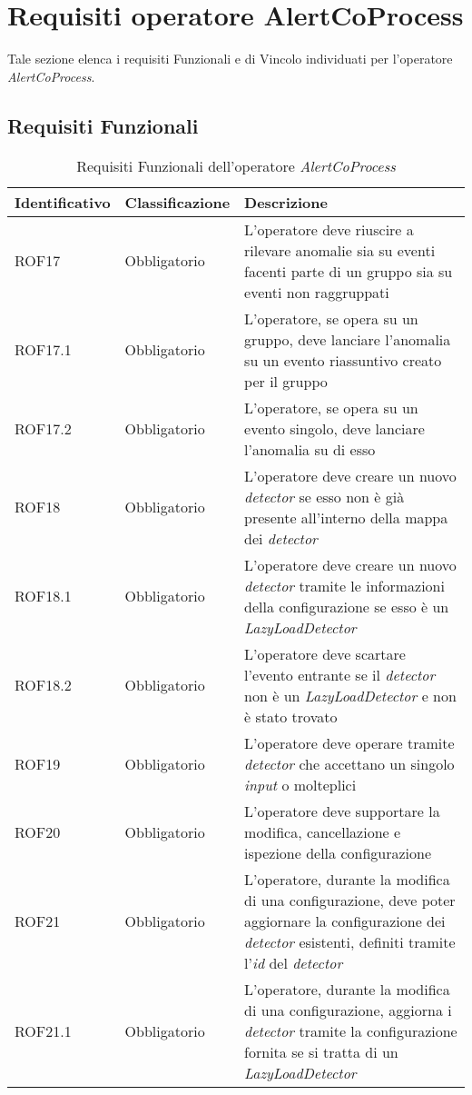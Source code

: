 \section{Requisiti operatore AlertCoProcess}
Tale sezione elenca i requisiti Funzionali e di Vincolo individuati per l'operatore \textit{AlertCoProcess}.
\subsection{Requisiti Funzionali}
{
\centering
\begin{longtable}{L{3cm} L{3cm} L{7.5cm}}
\caption{Requisiti Funzionali dell'operatore \textit{AlertCoProcess}}\\
\textbf{Identificativo} &
\textbf{Classificazione}&
\textbf{Descrizione}\\
\endhead
\hline
ROF17 & Obbligatorio & L'operatore deve riuscire a rilevare anomalie sia su eventi facenti parte di un gruppo sia su eventi non raggruppati\\
\hline
ROF17.1 & Obbligatorio & L'operatore, se opera su un gruppo, deve lanciare l'anomalia su un evento riassuntivo creato per il gruppo\\
\hline
ROF17.2 & Obbligatorio & L'operatore, se opera su un evento singolo, deve lanciare l'anomalia su di esso\\
\hline
ROF18 & Obbligatorio & L'operatore deve creare un nuovo \textit{detector} se esso non è già presente all'interno della mappa dei \textit{detector}\\
\hline
ROF18.1 & Obbligatorio & L'operatore deve creare un nuovo \textit{detector} tramite le informazioni della configurazione se esso è un \textit{LazyLoadDetector}\\
\hline
ROF18.2 & Obbligatorio & L'operatore deve scartare l'evento entrante se il \textit{detector} non è un \textit{LazyLoadDetector} e non è stato trovato\\
\hline
ROF19 & Obbligatorio & L'operatore deve operare tramite \textit{detector} che accettano un singolo \textit{input} o molteplici\\
\hline
ROF20 & Obbligatorio & L'operatore deve supportare la modifica, cancellazione e ispezione della configurazione\\
\hline
ROF21 & Obbligatorio & L'operatore, durante la modifica di una configurazione, deve poter aggiornare la configurazione dei \textit{detector} esistenti, definiti tramite l'\textit{id} del \textit{detector}\\
\hline
ROF21.1 & Obbligatorio & L'operatore, durante la modifica di una configurazione, aggiorna i \textit{detector} tramite la configurazione fornita se si tratta di un \textit{LazyLoadDetector}\\

\end{longtable}}
